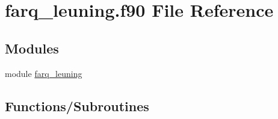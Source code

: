 \hypertarget{farq__leuning_8f90}{}\section{farq\+\_\+leuning.\+f90 File Reference}
\label{farq__leuning_8f90}
\subsection*{Modules}
\begin{DoxyCompactItemize}
\item 
module \hyperlink{namespacefarq__leuning}{farq\+\_\+leuning}
\end{DoxyCompactItemize}
\subsection*{Functions/\+Subroutines}
